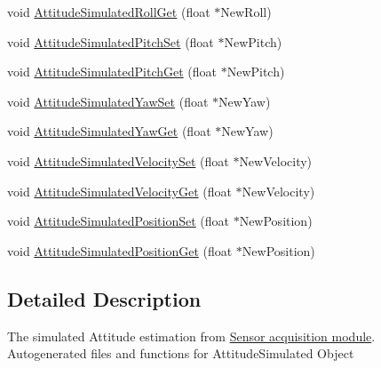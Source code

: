 \begin{DoxyCompactItemize}
\item 
void \hyperlink{group___attitude_simulated_ga1cffdd496613b88fd97cd56d88572147}{\-Attitude\-Simulated\-Roll\-Get} (float $\ast$\-New\-Roll)
\item 
void \hyperlink{group___attitude_simulated_ga39145dff8512ad894afd0a14cad2fc65}{\-Attitude\-Simulated\-Pitch\-Set} (float $\ast$\-New\-Pitch)
\item 
void \hyperlink{group___attitude_simulated_gaabf26de9f7a74529abdb45966f2379df}{\-Attitude\-Simulated\-Pitch\-Get} (float $\ast$\-New\-Pitch)
\item 
void \hyperlink{group___attitude_simulated_ga8a60001d0ca9d528953038bfa707bb22}{\-Attitude\-Simulated\-Yaw\-Set} (float $\ast$\-New\-Yaw)
\item 
void \hyperlink{group___attitude_simulated_ga2d7b1fbfc94051c7e87a41c4b81102a3}{\-Attitude\-Simulated\-Yaw\-Get} (float $\ast$\-New\-Yaw)
\item 
void \hyperlink{group___attitude_simulated_ga5e137ef05dbabeefd33923d0e87d01af}{\-Attitude\-Simulated\-Velocity\-Set} (float $\ast$\-New\-Velocity)
\item 
void \hyperlink{group___attitude_simulated_ga845e4918ae07fa7bbcdc977c3d3f0613}{\-Attitude\-Simulated\-Velocity\-Get} (float $\ast$\-New\-Velocity)
\item 
void \hyperlink{group___attitude_simulated_gacb3aa9e51ccc9d27b589592c5d9ef42d}{\-Attitude\-Simulated\-Position\-Set} (float $\ast$\-New\-Position)
\item 
void \hyperlink{group___attitude_simulated_gabdfc9211ff05778fbc06f3401e0cbdfb}{\-Attitude\-Simulated\-Position\-Get} (float $\ast$\-New\-Position)
\end{DoxyCompactItemize}


\subsection{\-Detailed \-Description}
\-The simulated \-Attitude estimation from \hyperlink{group___sensors}{\-Sensor acquisition module}. \-Autogenerated files and functions for \-Attitude\-Simulated \-Object 

